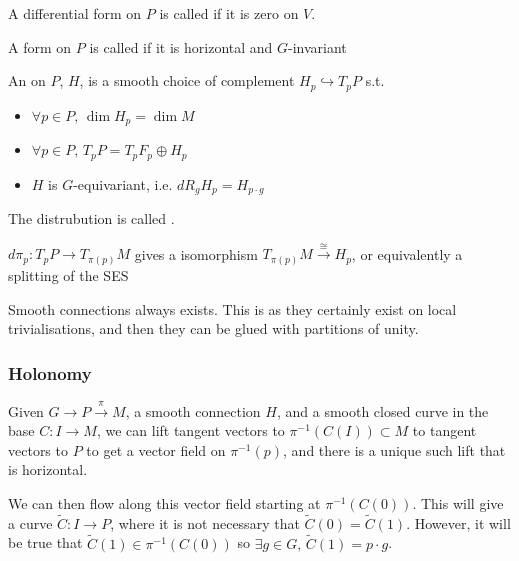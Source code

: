 \documentclass{article}
\begin{document}
\begin{definition}
	A differential form on $P$ is called  if it is zero on $V$. 
\end{definition}

\begin{definition}
	A form on $P$ is called  if it is horizontal and $G$-invariant 
\end{definition}

\begin{definition}
An  on $P$, $H$, is a smooth choice of complement $H_p \hookrightarrow T_pP$ s.t. 
\begin{itemize}
    \item $\forall p \in P, \, \dim H_p = \dim M$ 
    \item $\forall p \in P, \, T_pP = T_p F_p \oplus H_p$
    \item $H$ is $G$-equivariant, i.e. $dR_g H_p = H_{p \cdot g}$
\end{itemize}
The distrubution is called .
\end{definition}

\begin{remark}
$d\pi_p : T_p P \to T_{\pi(p)}M$ gives a isomorphism $T_{\pi(p)} M \overset{\cong}{\to} H_p$, or equivalently a splitting of the SES
\end{remark}

\begin{remark}
Smooth connections always exists. This is as they certainly exist on local trivialisations, and then they can be glued with partitions of unity. 
\end{remark}



\subsubsection{Holonomy}

\begin{lemma}
Given $G \to P \overset{\pi}{\to} M$, a smooth connection $H$, and a smooth closed curve in the base $C: I \to M$, we can lift tangent vectors to $\pi^{-1}(C(I)) \subset M$ to tangent vectors to $P$ to get a vector field on $\pi^{-1}(p)$, and there is a unique such lift that is horizontal.
\end{lemma}
We can then flow along this vector field starting at $\pi^{-1}(C(0))$. This will give a curve $\tilde{C}:I \to P$, where it is not necessary that $\tilde{C}(0) = \tilde{C}(1)$. However, it will be true that $\tilde{C}(1) \in \pi^{-1}(C(0))$ so $\exists g \in G, \, \tilde{C}(1) = p \cdot g$. 
\end{document}
